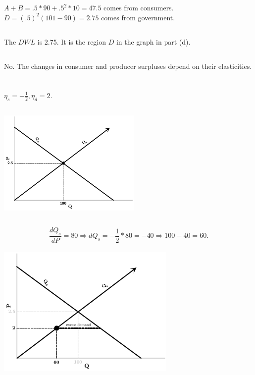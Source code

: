 \documentclass{article}
\begin{document}
	\subsection[e]{}
		$A+B = .5*90 + .5^2*10 = 47.5 $ comes from consumers. $D=(.5)^2(101-90) = 2.75$ comes from government. 
	\subsection[f]{}
		The $DWL$ is 2.75. It is the region $D$ in the graph in part (d). 
	\subsection[g]{}
		No. The changes in consumer and producer surpluses depend on their elasticities. 
\section[7]{}
	\subsection[a]{}
		$\eta_s = -\frac{1}{2}, \eta_d = 2.$
	\subsection[b]{}
		\includegraphics[height=2in]{Charts/7b}
	\subsection[c]{}
		$$ \frac{dQ_s}{dP}=80 \Rightarrow dQ_s = -\frac{1}{2}*80 = -40 \Rightarrow 100-40 = 60.$$ \\
		\includegraphics[height=2.5in]{Charts/7c}
\end{document}

